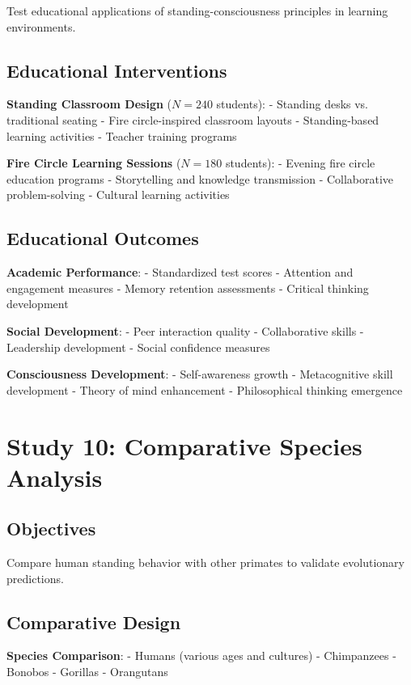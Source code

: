 \documentclass[12pt]{article}
\begin{document}
Test educational applications of standing-consciousness principles in learning environments.

\subsection{Educational Interventions}

\textbf{Standing Classroom Design} ($N = 240$ students):
- Standing desks vs. traditional seating
- Fire circle-inspired classroom layouts
- Standing-based learning activities
- Teacher training programs

\textbf{Fire Circle Learning Sessions} ($N = 180$ students):
- Evening fire circle education programs
- Storytelling and knowledge transmission
- Collaborative problem-solving
- Cultural learning activities

\subsection{Educational Outcomes}

\textbf{Academic Performance}:
- Standardized test scores
- Attention and engagement measures  
- Memory retention assessments
- Critical thinking development

\textbf{Social Development}:
- Peer interaction quality
- Collaborative skills
- Leadership development
- Social confidence measures

\textbf{Consciousness Development}:
- Self-awareness growth
- Metacognitive skill development
- Theory of mind enhancement
- Philosophical thinking emergence

\section{Study 10: Comparative Species Analysis}

\subsection{Objectives}

Compare human standing behavior with other primates to validate evolutionary predictions.

\subsection{Comparative Design}

\textbf{Species Comparison}:
- Humans (various ages and cultures)
- Chimpanzees
- Bonobos  
- Gorillas
- Orangutans
\end{document}
